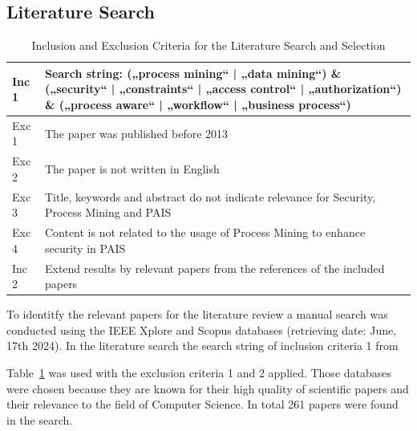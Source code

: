 \documentclass[runningheads]{llncs}
\begin{document}
\subsection{Literature Search}\label{Search}
\begin{table}[h!]
    \centering
    \caption{Inclusion and Exclusion Criteria for the Literature Search and Selection}
    \begin{tabular}{ | m{1cm} | m{11cm} | }
        \hline
        Inc 1 & Search string: („process mining“ | „data mining“) \& („security“ | „constraints“ | „access control“ | „authorization“) \& („process aware“ | „workflow“ | „business process“) \\
        \hline
        Exc 1 & The paper was published before 2013                                                                                                                                           \\
        \hline
        Exc 2 & The paper is not written in English                                                                                                                                           \\
        \hline
        Exc 3 & Title, keywords and abstract do not indicate relevance for Security, Process Mining and PAIS                                                                                  \\
        \hline
        Exc 4 & Content is not related to the usage of Process Mining to enhance security in PAIS                                                                                             \\
        \hline
        Inc 2 & Extend results by relevant papers from the references of the included papers                                                                                                  \\
        \hline
    \end{tabular}
    \label{criteria}
\end{table}
To identitfy the relevant papers for the literature review a manual search was conducted using the IEEE Xplore and Scopus databases (retrieving date: June, 17th 2024). In the literature search the search string of inclusion criteria 1 from

Table~\ref{criteria} was used with the exclusion criteria 1 and 2 applied. Those databases were chosen because they are known for their high quality of scientific papers and their relevance to the field of Computer Science. In total 261 papers were found in the search.
\end{document}
